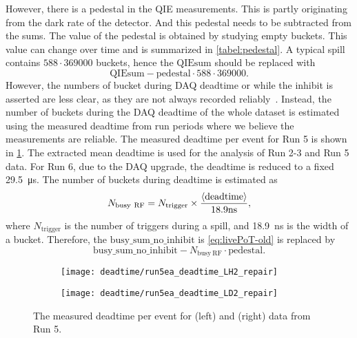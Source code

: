 \documentclass[../main.tex]{subfiles}
\begin{document}
However, there is a pedestal in the QIE measurements. This is partly originating from the dark rate of the
detector. And this pedestal needs to be subtracted from the sums.
The value of the pedestal is obtained by studying empty buckets.
This value can change over time and is summarized in \cref{tabel:pedestal}.
A typical spill contains $588\cdot 369000$ buckets, hence the $\mathrm{QIEsum}$ should be replaced with
\begin{equation}
	\mathrm{QIEsum}-\mathrm{pedestal}\cdot 588\cdot 369000.
\end{equation}
However, the numbers of bucket during DAQ deadtime or while the inhibit is asserted are less clear,
as they are not always recorded reliably~\cite{chleung-10662}.
Instead, the number of buckets during the DAQ deadtime of the whole dataset
is estimated using the measured deadtime from run periods where we believe the measurements are reliable.
The measured deadtime per event for Run 5 is shown in \cref{fig:deadtime}.
The extracted mean deadtime is used for the analysis of Run 2-3 and Run 5 data.
For Run 6, due to the DAQ upgrade, the deadtime is reduced to a fixed \SI{29.5}{\us}.
The number of buckets during deadtime is estimated as
\begin{equation}
	N_{\mathrm{busy\ RF}}=N_{\mathrm{trigger}}\times\frac{\expval{\mathrm{deadtime}}}{18.9\unit{\ns}},
\end{equation}
where $N_{\mathrm{trigger}}$ is the number of triggers during a spill, and \SI{18.9}{\ns} is the width of a bucket.
Therefore, the $\mathrm{busy\_sum\_no\_inhibit}$ is \cref{eq:livePoT-old} is replaced by
\begin{equation}
	\mathrm{busy\_sum\_no\_inhibit} - N_{\mathrm{busy\ RF}}\cdot \mathrm{pedestal}.
\end{equation}
\begin{figure}[h!]
	\centering
	\begin{subfigure}{0.45\linewidth}
		\texttt{[image: deadtime/run5ea\_deadtime\_LH2\_repair]}
	\end{subfigure}
	\begin{subfigure}{0.45\linewidth}
		\texttt{[image: deadtime/run5ea\_deadtime\_LD2\_repair]}
	\end{subfigure}
	\caption{The measured deadtime per event for  (left) and  (right) data from Run 5.}
	\label{fig:deadtime}
\end{figure}
\end{document}
